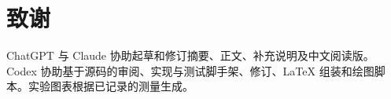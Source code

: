 \section*{致谢}
ChatGPT 与 Claude 协助起草和修订摘要、正文、补充说明及中文阅读版。Codex 协助基于源码的审阅、实现与测试脚手架、修订、LaTeX 组装和绘图脚本。实验图表根据已记录的测量生成。
